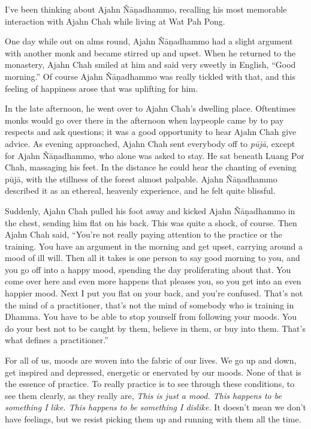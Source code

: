 
I've been thinking about Ajahn Ñāṇadhammo, recalling his most 
memorable interaction with Ajahn Chah while living at Wat Pah Pong.

One day while out on alms round, Ajahn Ñāṇadhammo had a slight 
argument with another monk and became stirred up and upset. When he 
returned to the monastery, Ajahn Chah smiled at him and said very 
sweetly in English, ``Good morning.'' Of course Ajahn Ñāṇadhammo 
was really tickled with that, and this feeling of happiness arose that 
was uplifting for him.

In the late afternoon, he went over to Ajahn Chah's dwelling place. 
Oftentimes monks would go over there in the afternoon when laypeople 
came by to pay respects and ask questions; it was a good opportunity to 
hear Ajahn Chah give advice. As evening approached, Ajahn Chah sent 
everybody off to \emph{pūjā,} except for Ajahn Ñāṇadhammo, who 
alone was asked to stay. He sat beneath Luang Por Chah, massaging his 
feet. In the distance he could hear the chanting of evening pūjā, 
with the stillness of the forest almost palpable. Ajahn Ñāṇadhammo 
described it as an ethereal, heavenly experience, and he felt quite 
blissful.

Suddenly, Ajahn Chah pulled his foot away and kicked Ajahn 
Ñāṇadhammo in the chest, sending him flat on his back. This was 
quite a shock, of course. Then Ajahn Chah said, ``You're not really 
paying attention to the practice or the training. You have an argument 
in the morning and get upset, carrying around a mood of ill will. Then 
all it takes is one person to say good morning to you, and you go off 
into a happy mood, spending the day proliferating about that. You come 
over here and even more happens that pleases you, so you get into an 
even happier mood. Next I put you flat on your back, and you're 
confused. That's not the mind of a practitioner, that's not the mind of 
somebody who is training in Dhamma. You have to be able to stop 
yourself from following your moods. You do your best not to be caught 
by them, believe in them, or buy into them. That's what defines a 
practitioner.''

For all of us, moods are woven into the fabric of our lives. We go up 
and down, get inspired and depressed, energetic or enervated by our 
moods. None of that is the essence of practice. To really practice is 
to see through these conditions, to see them clearly, as they really 
are, \emph{This is just a mood. This happens to be something I like. 
This happens to be something I dislike.} It doesn't mean we don't have 
feelings, but we resist picking them up and running with them all the 
time.

